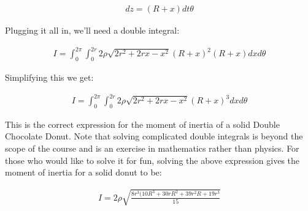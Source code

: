 \begin{solution}
\begin{align*}
dz=(R+x)dt\theta
\end{align*}

Plugging it all in, we'll need a double integral:

\begin{align*}
I=\int_{0}^{2\pi}\int_{0}^{2r} 2\rho\sqrt{2r^{2}+2rx-x^{2}}(R+x)^{2}(R+x)dxd\theta
\end{align*}

Simplifying this we get:

\begin{align*}
I=\int_{0}^{2\pi}\int_{0}^{2r} 2\rho\sqrt{2r^{2}+2rx-x^{2}}(R+x)^{3}dxd\theta
\end{align*}

This is the correct expression for the moment of inertia of a solid Double Chocolate Donut. Note that solving complicated double integrals is beyond the scope of the course and is an exercise in mathematics rather than physics. For those who would like to solve it for fun, solving the above expression gives the moment of inertia for a solid donut to be:

\begin{align*}
I=2\rho \sqrt{\frac{8r^{3}(10R^{3}+30rR^{2}+39r^{2}R+19r^{3}}{15}}
\end{align*}
\end{solution}


